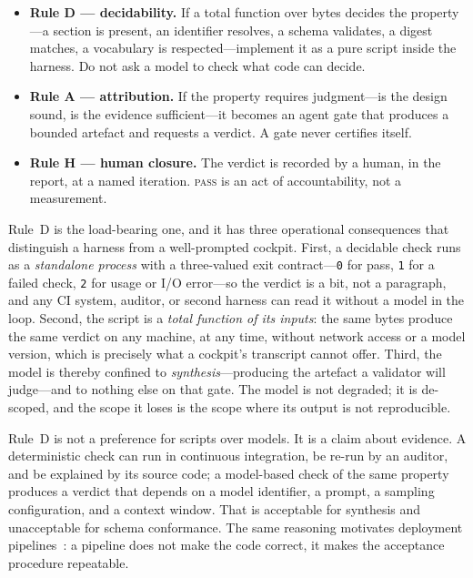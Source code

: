 \documentclass[10pt,a4paper]{article}
\theoremstyle{definition}
\theoremstyle{plain}
\theoremstyle{principle}
\newcommand{\code}[1]{\texttt{#1}}
\begin{document}
\begin{itemize}
  \item \textbf{Rule D --- decidability.} If a total function over bytes decides the property---a
        section is present, an identifier resolves, a schema validates, a digest matches, a
        vocabulary is respected---implement it as a pure script inside the harness. Do not ask a
        model to check what code can decide.
  \item \textbf{Rule A --- attribution.} If the property requires judgment---is the design sound,
        is the evidence sufficient---it becomes an agent gate that produces a bounded artefact and
        requests a verdict. A gate never certifies itself.
  \item \textbf{Rule H --- human closure.} The verdict is recorded by a human, in the report, at a
        named iteration. \textnormal{\textsc{pass}} is an act of accountability, not a measurement.
\end{itemize}

Rule~D is the load-bearing one, and it has three operational consequences that distinguish a
harness from a well-prompted cockpit. First, a decidable check runs as a \emph{standalone process}
with a three-valued exit contract---\code{0} for pass, \code{1} for a failed check, \code{2} for
usage or I/O error---so the verdict is a bit, not a paragraph, and any CI system, auditor, or
second harness can read it without a model in the loop. Second, the script is a \emph{total
function of its inputs}: the same bytes produce the same verdict on any machine, at any time,
without network access or a model version, which is precisely what a cockpit's transcript cannot
offer. Third, the model is thereby confined to \emph{synthesis}---producing the artefact a
validator will judge---and to nothing else on that gate. The model is not degraded; it is
de-scoped, and the scope it loses is the scope where its output is not reproducible.

Rule~D is not a preference for scripts over models. It is a claim about evidence. A deterministic
check can run in continuous integration, be re-run by an auditor, and be explained by its source
code; a model-based check of the same property produces a verdict that depends on a model
identifier, a prompt, a sampling configuration, and a context window. That is acceptable for
synthesis and unacceptable for schema conformance. The same reasoning motivates deployment
pipelines~\cite{humble2010}: a pipeline does not make the code correct, it makes the acceptance
procedure repeatable.
\end{document}
